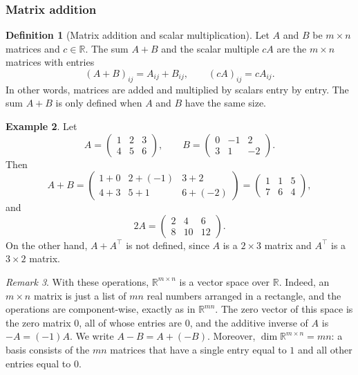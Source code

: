 \documentclass[11pt]{article}
\theoremstyle{definition}
\newtheorem{definition}{Definition}[section]
\newtheorem{example}[definition]{Example}
\theoremstyle{plain}
\theoremstyle{remark}
\newtheorem{remark}[definition]{Remark}
\begin{document}
\subsubsection{Matrix addition}

\begin{definition}[Matrix addition and scalar multiplication]
    Let $A$ and $B$ be $m \times n$ matrices and $c \in \mathbb{R}$. The sum $A + B$ and the scalar multiple $cA$ are the $m \times n$ matrices with entries
    \[(A + B)_{ij} = A_{ij} + B_{ij}, \qquad (cA)_{ij} = c A_{ij}.\]
    In other words, matrices are added and multiplied by scalars entry by entry. The sum $A + B$ is only defined when $A$ and $B$ have the same size.
\end{definition}

\begin{example}
    Let
    \[A = \begin{pmatrix}
        1 & 2 & 3 \\
        4 & 5 & 6
    \end{pmatrix}, \qquad B = \begin{pmatrix}
        0 & -1 & 2 \\
        3 & 1 & -2
    \end{pmatrix}.\]
    Then
    \[A + B = \begin{pmatrix}
        1 + 0 & 2 + (-1) & 3 + 2 \\
        4 + 3 & 5 + 1 & 6 + (-2)
    \end{pmatrix} = \begin{pmatrix}
        1 & 1 & 5 \\
        7 & 6 & 4
    \end{pmatrix},\]
    and
    \[2A = \begin{pmatrix}
        2 & 4 & 6 \\
        8 & 10 & 12
    \end{pmatrix}.\]
    On the other hand, $A + A^\top$ is not defined, since $A$ is a $2 \times 3$ matrix and $A^\top$ is a $3 \times 2$ matrix.
\end{example}

\begin{remark}\label{rem:matrix-space}
    With these operations, $\mathbb{R}^{m \times n}$ is a vector space over $\mathbb{R}$. Indeed, an $m \times n$ matrix is just a list of $mn$ real numbers arranged in a rectangle, and the operations are component-wise, exactly as in $\mathbb{R}^{mn}$. The zero vector of this space is the zero matrix $0$, all of whose entries are $0$, and the additive inverse of $A$ is $-A = (-1)A$. We write $A - B = A + (-B)$. Moreover, $\dim \mathbb{R}^{m \times n} = mn$: a basis consists of the $mn$ matrices that have a single entry equal to $1$ and all other entries equal to $0$.
\end{remark}
\end{document}
